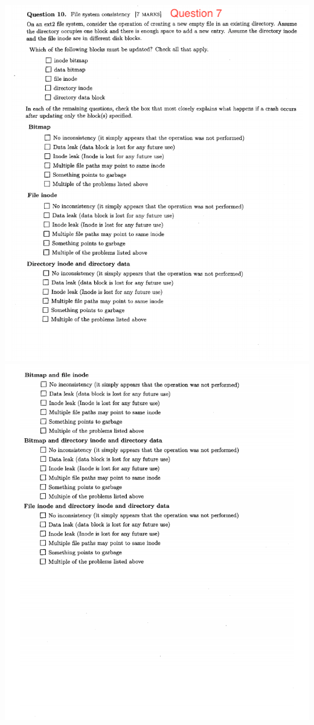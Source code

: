 \documentclass[12pt]{article}
\begin{document}
\begin{center}
\includegraphics[width=\linewidth]{../images/midterm_4_11.png}
\includegraphics[width=\linewidth]{../images/midterm_4_12.png}

\end{center}
\end{document}
